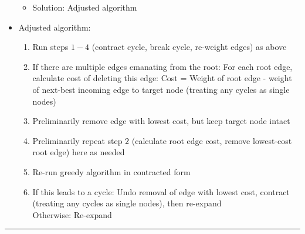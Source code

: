 \begin{itemize}
\begin{itemize}
        \item Solution: Adjusted algorithm
    \end{itemize}
    \item Adjusted algorithm:
    \begin{enumerate}
        \item Run steps $1-4$ (contract cycle, break cycle, re-weight edges) as above
        \item If there are multiple edges emanating from the root: For each root edge, calculate cost of deleting this edge: Cost = Weight of root edge - weight of next-best incoming edge to target node (treating any cycles as single nodes)
        \item Preliminarily remove edge with lowest cost, but keep target node intact
        \item Preliminarily repeat step $2$ (calculate root edge cost, remove lowest-cost root edge) here as needed
        \item Re-run greedy algorithm in contracted form
        \item If this leads to a cycle: Undo removal of edge with lowest cost, contract (treating any cycles as single nodes), then re-expand\\
        Otherwise: Re-expand
    \end{enumerate}
\end{itemize}

{\color{black}\hrule height 0.001mm}

